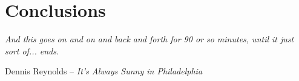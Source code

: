 \chapter{Conclusions}

\epigraph{\textit{And this goes on and on and back and forth for 90 or so minutes, until it just sort of... ends.}}{Dennis Reynolds -- \textit{It's Always Sunny in Philadelphia}}